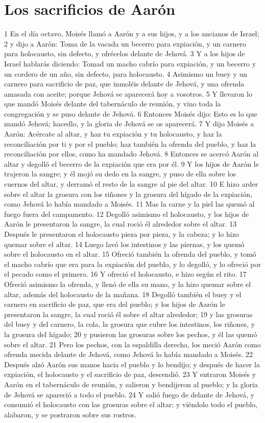 \section{Los sacrificios de Aarón}

1 En el día octavo, Moisés llamó a Aarón y a sus hijos, y a los ancianos de Israel;
2 y dijo a Aarón: Toma de la vacada un becerro para expiación, y un carnero para holocausto, sin defecto, y ofrécelos delante de Jehová.
3 Y a los hijos de Israel hablarás diciendo: Tomad un macho cabrío para expiación, y un becerro y un cordero de un año, sin defecto, para holocausto.
4 Asimismo un buey y un carnero para sacrificio de paz, que inmoléis delante de Jehová, y una ofrenda amasada con aceite; porque Jehová se aparecerá hoy a vosotros.
5 Y llevaron lo que mandó Moisés delante del tabernáculo de reunión, y vino toda la congregación y se puso delante de Jehová.
6 Entonces Moisés dijo: Esto es lo que mandó Jehová; hacedlo, y la gloria de Jehová se os aparecerá.
7 Y dijo Moisés a Aarón: Acércate al altar, y haz tu expiación y tu holocausto, y haz la reconciliación por ti y por el pueblo; haz también la ofrenda del pueblo, y haz la reconciliación por ellos, como ha mandado Jehová.
8 Entonces se acercó Aarón al altar y degolló el becerro de la expiación que era por él.
9 Y los hijos de Aarón le trajeron la sangre; y él mojó su dedo en la sangre, y puso de ella sobre los cuernos del altar, y derramó el resto de la sangre al pie del altar.
10 E hizo arder sobre el altar la grosura con los riñones y la grosura del hígado de la expiación, como Jehová lo había mandado a Moisés.
11 Mas la carne y la piel las quemó al fuego fuera del campamento.
12 Degolló asimismo el holocausto, y los hijos de Aarón le presentaron la sangre, la cual roció él alrededor sobre el altar.
13 Después le presentaron el holocausto pieza por pieza, y la cabeza; y lo hizo quemar sobre el altar.
14 Luego lavó los intestinos y las piernas, y los quemó sobre el holocausto en el altar.
15 Ofreció también la ofrenda del pueblo, y tomó el macho cabrío que era para la expiación del pueblo, y lo degolló, y lo ofreció por el pecado como el primero.
16 Y ofreció el holocausto, e hizo según el rito.
17 Ofreció asimismo la ofrenda, y llenó de ella su mano, y la hizo quemar sobre el altar, además del holocausto de la mañana.
18 Degolló también el buey y el carnero en sacrificio de paz, que era del pueblo; y los hijos de Aarón le presentaron la sangre, la cual roció él sobre el altar alrededor;
19 y las grosuras del buey y del carnero, la cola, la grosura que cubre los intestinos, los riñones, y la grosura del hígado;
20 y pusieron las grosuras sobre los pechos, y él las quemó sobre el altar.
21 Pero los pechos, con la espaldilla derecha, los meció Aarón como ofrenda mecida delante de Jehová, como Jehová lo había mandado a Moisés.
22 Después alzó Aarón sus manos hacia el pueblo y lo bendijo; y después de hacer la expiación, el holocausto y el sacrificio de paz, descendió.
23 Y entraron Moisés y Aarón en el tabernáculo de reunión, y salieron y bendijeron al pueblo; y la gloria de Jehová se apareció a todo el pueblo.
24 Y salió fuego de delante de Jehová, y consumió el holocausto con las grosuras sobre el altar; y viéndolo todo el pueblo, alabaron, y se postraron sobre sus rostros.  

